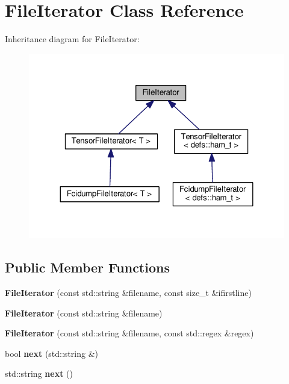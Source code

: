 \hypertarget{classFileIterator}{}\section{File\+Iterator Class Reference}
\label{classFileIterator}


Inheritance diagram for File\+Iterator\+:
\nopagebreak
\begin{figure}[H]
\begin{center}
\leavevmode
\includegraphics[width=324pt]{classFileIterator__inherit__graph}
\end{center}
\end{figure}
\subsection*{Public Member Functions}
\begin{DoxyCompactItemize}
\item 
{\bfseries File\+Iterator} (const std\+::string \&filename, const size\+\_\+t \&ifirstline)\hypertarget{classFileIterator_a664201608652425655f7631194fc8a5f}{}\label{classFileIterator_a664201608652425655f7631194fc8a5f}

\item 
{\bfseries File\+Iterator} (const std\+::string \&filename)\hypertarget{classFileIterator_a72bdb8a60601e50cc74fa31a3031539e}{}\label{classFileIterator_a72bdb8a60601e50cc74fa31a3031539e}

\item 
{\bfseries File\+Iterator} (const std\+::string \&filename, const std\+::regex \&regex)\hypertarget{classFileIterator_ada8942b79a19dae2a0b668949ac08912}{}\label{classFileIterator_ada8942b79a19dae2a0b668949ac08912}

\item 
bool {\bfseries next} (std\+::string \&)\hypertarget{classFileIterator_a4d395f3fce39962f4a754868143fc318}{}\label{classFileIterator_a4d395f3fce39962f4a754868143fc318}

\item 
std\+::string {\bfseries next} ()\hypertarget{classFileIterator_ad362a010af079bcbfbccdfcc50488b0d}{}\label{classFileIterator_ad362a010af079bcbfbccdfcc50488b0d}

\end{DoxyCompactItemize}
